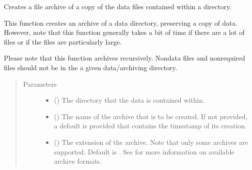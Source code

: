 \documentclass[letterpaper,10pt,english]{sphinxmanual}
\begin{document}

\begin{fulllineitems}
\label{\detokenize{docstrings/ifa_smeargle.core.io:ifa_smeargle.core.io.archive_data_directory}}
Creates a file archive of a copy of the data files contained
within a directory.

This function creates an archive of a data directory, preserving
a copy of data. However, note that this function generally takes
a bit of time if there are a lot of files or if the files are
particularly large.

Please note that this function archives recursively. Non\sphinxhyphen{}data
files and non\sphinxhyphen{}required files should not be in the a given
data/archiving directory.
\begin{quote}\begin{description}
\item[{Parameters}] \leavevmode\begin{itemize}
\item {} 
 () \textendash{} The directory that the data is contained within.

\item {} 
 (\sphinxstyleliteralemphasis{\sphinxupquote{ (}}\sphinxstyleliteralemphasis{\sphinxupquote{)}}) \textendash{} The name of the archive that is to be created. If not
provided, a default is provided that contains the time\sphinxhyphen{}stamp
of its creation.

\item {} 
 (\sphinxstyleliteralemphasis{\sphinxupquote{ (}}\sphinxstyleliteralemphasis{\sphinxupquote{)}}) \textendash{} The extension of the archive. Note that only some archives
are supported. Default is . See
 for more information on
available archive formats.


\end{itemize}
\end{description}
\end{quote}
\end{fulllineitems}
\end{document}

